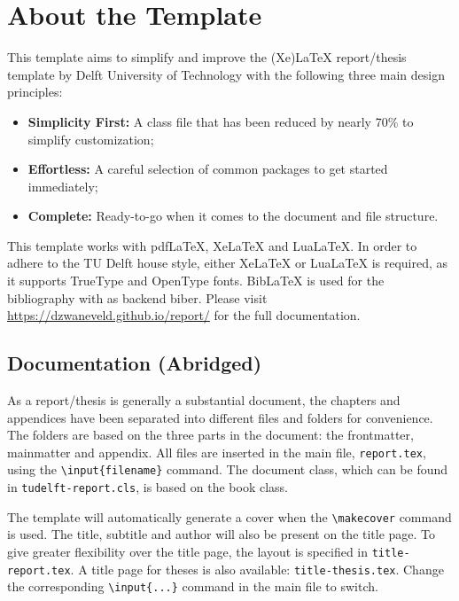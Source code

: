 \chapter{About the Template}

This template aims to simplify and improve the (Xe)LaTeX report/thesis template by Delft University of Technology with the following three main design principles:

\begin{itemize}
  \item \textbf{Simplicity First:} A class file that has been reduced by nearly 70\% to simplify customization;
  \item \textbf{Effortless:} A careful selection of common packages to get started immediately;
  \item \textbf{Complete:} Ready-to-go when it comes to the document and file structure.
\end{itemize}

\noindent This template works with pdfLaTeX, XeLaTeX and LuaLaTeX. In order to adhere to the TU Delft house style, either XeLaTeX or LuaLaTeX is required, as it supports TrueType and OpenType fonts. BibLaTeX is used for the bibliography with as backend biber. Please visit \url{https://dzwaneveld.github.io/report/} for the full documentation.

\section*{Documentation (Abridged)}

As a report/thesis is generally a substantial document, the chapters and appendices have been separated into different files and folders for convenience. The folders are based on the three parts in the document: the frontmatter, mainmatter and appendix. All files are inserted in the main file, \texttt{report.tex}, using the \texttt{\textbackslash input\{filename\}} command. The document class, which can be found in \texttt{tudelft-report.cls}, is based on the book class. 

The template will automatically generate a cover when the \texttt{\textbackslash makecover} command is used. The title, subtitle and author will also be present on the title page. To give greater flexibility over the title page, the layout is specified in \texttt{title-report.tex}. A title page for theses is also available: \texttt{title-thesis.tex}. Change the corresponding \texttt{\textbackslash input\{...\}} command in the main file to switch. 

